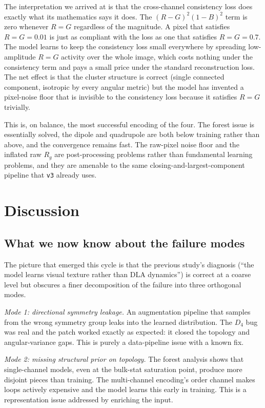 \documentclass[11pt]{article}
\begin{document}
The interpretation we arrived at is that the cross-channel consistency loss does exactly what its mathematics says it does. The $(R - G)^2 (1 - B)^2$ term is zero whenever $R = G$ regardless of the magnitude. A pixel that satisfies $R = G = 0.01$ is just as compliant with the loss as one that satisfies $R = G = 0.7$. The model learns to keep the consistency loss small everywhere by spreading low-amplitude $R = G$ activity over the whole image, which costs nothing under the consistency term and pays a small price under the standard reconstruction loss. The net effect is that the cluster structure is correct (single connected component, isotropic by every angular metric) but the model has invented a pixel-noise floor that is invisible to the consistency loss because it satisfies $R = G$ trivially.

This is, on balance, the most successful encoding of the four. The forest issue is essentially solved, the dipole and quadrupole are both below training rather than above, and the convergence remains fast. The raw-pixel noise floor and the inflated raw $R_g$ are post-processing problems rather than fundamental learning problems, and they are amenable to the same closing-and-largest-component pipeline that \texttt{v3} already uses.

\section{Discussion}

\subsection{What we now know about the failure modes}

The picture that emerged this cycle is that the previous study's diagnosis (``the model learns visual texture rather than DLA dynamics'') is correct at a coarse level but obscures a finer decomposition of the failure into three orthogonal modes.

\textit{Mode 1: directional symmetry leakage.} An augmentation pipeline that samples from the wrong symmetry group leaks into the learned distribution. The $D_4$ bug was real and the patch worked exactly as expected: it closed the topology and angular-variance gaps. This is purely a data-pipeline issue with a known fix.

\textit{Mode 2: missing structural prior on topology.} The forest analysis shows that single-channel models, even at the bulk-stat saturation point, produce more disjoint pieces than training. The multi-channel encoding's order channel makes loops actively expensive and the model learns this early in training. This is a representation issue addressed by enriching the input.
\end{document}
